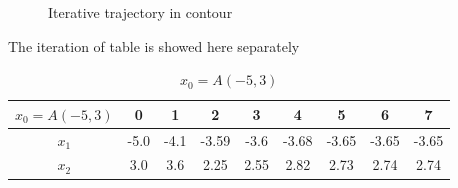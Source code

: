 \begin{figure}[H]
{}
\quad
{}
\quad
{}
\caption{ Iterative trajectory in contour}
\end{figure}

The iteration of table is showed here separately
\begin{table}[H]
\centering
\setlength{\abovecaptionskip}{0cm} 
\setlength{\belowcaptionskip}{-0.5cm} 
\scriptsize
\begin{tabular}{|c|c|c|c|c|c|c|c|c|}
\hline
$x_0=A(-5,3)$&0&1&2&3&4&5&6&7\\
\hline
$x_1$&-5.0 & -4.1 & -3.59 & -3.6 & -3.68 & -3.65 & -3.65 & -3.65\\
\hline
$x_2$&3.0 & 3.6 & 2.25 & 2.55 & 2.82 & 2.73 & 2.74 & 2.74
\\
\hline
\end{tabular}
\caption{$x_0=A(-5,3)$}
\end{table}


